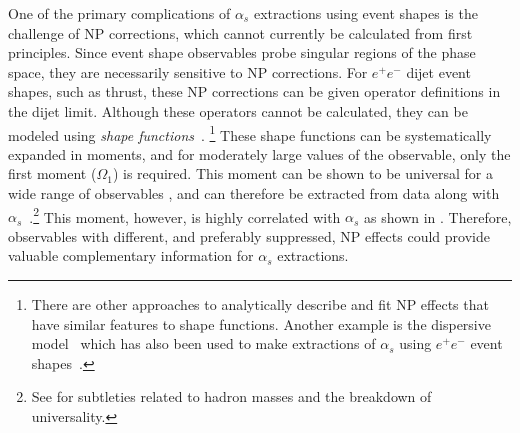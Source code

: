 One of the primary complications of $\alpha_s$ extractions using event shapes is the challenge of NP corrections, which cannot currently be calculated from first principles.
%
Since event shape observables probe singular regions of the phase space, they are necessarily sensitive to NP corrections.  
%
For $e^+e^-$ dijet event shapes, such as thrust, these NP corrections can be given operator definitions in the dijet limit.
%
Although these operators cannot be calculated, they can be modeled using \textit{shape functions}~\cite{Korchemsky:1999kt,Korchemsky:2000kp,Hoang:2007vb,Ligeti:2008ac}.%
\footnote{There are other approaches to analytically describe and fit NP effects that have similar features to shape functions.  Another example is the dispersive model~\cite{Dokshitzer:1995qm,Dokshitzer:1995zt} which has also been used to make extractions of $\alpha_s$ using $e^+e^-$ event shapes~\cite{Gehrmann:2012sc}.}
%
These shape functions can be systematically expanded in moments, and for moderately large values of the observable, only the first moment ($\Omega_1$) is required.
%
This moment can be shown to be universal for a wide range of observables \cite{Lee:2006fn,Lee:2007jr}, and can therefore be extracted from data along with $\alpha_s$~\cite{Abbate:2010xh,Abbate:2012jh,Hoang:2015hka}.\footnote{See  for subtleties related to hadron masses and the breakdown of universality.}
%
This moment, however, is highly correlated with $\alpha_s$ as shown in .
%
Therefore, observables with different, and preferably suppressed, NP effects could provide valuable complementary information for $\alpha_s$ extractions.
%

  

